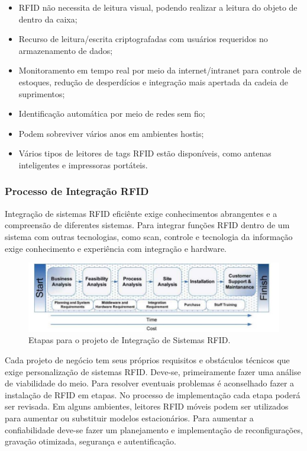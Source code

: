 		
		\begin{itemize}
			\item RFID não necessita de leitura visual, podendo realizar a leitura do objeto de dentro da caixa;
			\item Recurso de leitura/escrita criptografadas com usuários requeridos no armazenamento de dados;
			\item Monitoramento em tempo real por meio da internet/intranet para controle de estoques, redução de desperdícios e integração mais apertada da cadeia de suprimentos;
			\item Identificação automática por meio de redes sem fio;
			\item Podem sobreviver vários anos em ambientes hostis;
			\item Vários tipos de leitores de tags RFID estão disponíveis, como antenas inteligentes e impressoras portáteis.
		\end{itemize}
		
	
\subsubsection{Processo de Integração RFID}
Integração de sistemas RFID eficiênte exige conhecimentos abrangentes e a compreensão de diferentes sistemas. Para integrar funções RFID dentro de um sistema com outras tecnologias, como scan, controle e tecnologia da informação exige conhecimento e experiência com integração e hardware.


\begin{figure}[h!]
	\centering
		\includegraphics[width=0.7\linewidth]{etapas_integracao.jpg}
	\caption{Etapas para o projeto de Integração de Sistemas RFID.}
	\label{fig:etapas_integracao}
\end{figure}


		Cada projeto de negócio tem seus próprios requisitos e obstáculos técnicos que exige personalização de sistemas RFID. Deve-se, primeiramente fazer uma análise de viabilidade do meio. Para resolver eventuais problemas é aconselhado fazer a instalação de RFID em etapas. No processo de implementação cada etapa poderá ser revisada. Em alguns ambientes, leitores RFID móveis podem ser utilizados para aumentar ou substituir modelos estacionários.
		Para aumentar a confiabilidade deve-se fazer um planejamento e implementação de reconfigurações, gravação otimizada, segurança e autentificação.
		

